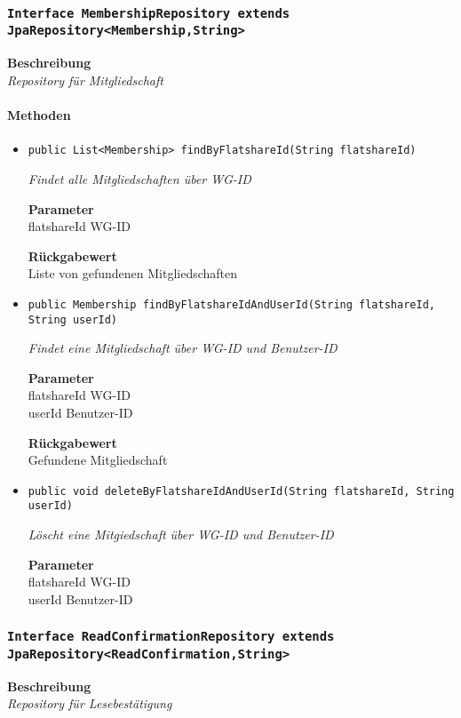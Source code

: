      \subsubsection{\texttt{Interface MembershipRepository extends JpaRepository<Membership,String>}}
     \textbf{Beschreibung} \\
     \textit{Repository für Mitgliedschaft}
     \paragraph*{Methoden}
     \begin{itemize}
     	\item{\texttt{public List<Membership> findByFlatshareId(String flatshareId)}}
     	
     	\textit{Findet alle Mitgliedschaften über WG-ID}
     	
     	\textbf{Parameter} \\
     	flatshareId WG-ID
     	
     	\textbf{Rückgabewert} \\
     	Liste von gefundenen Mitgliedschaften        \item{\texttt{public Membership findByFlatshareIdAndUserId(String flatshareId, String userId)}}
     	
     	\textit{Findet eine Mitgliedschaft über WG-ID und Benutzer-ID}
     	
     	\textbf{Parameter} \\
     	flatshareId WG-ID\\
     	userId Benutzer-ID
     	
     	\textbf{Rückgabewert} \\
     	Gefundene Mitgliedschaft        \item{\texttt{public void deleteByFlatshareIdAndUserId(String flatshareId, String userId)}}
     	
     	\textit{Löscht eine Mitgiedschaft über WG-ID und Benutzer-ID}
     	
     	\textbf{Parameter} \\
     	flatshareId WG-ID\\
     	userId Benutzer-ID
     	
     	
     \end{itemize}
     \subsubsection{\texttt{Interface ReadConfirmationRepository extends JpaRepository<ReadConfirmation,String>}}
     \textbf{Beschreibung} \\
     \textit{Repository für Lesebestätigung}
